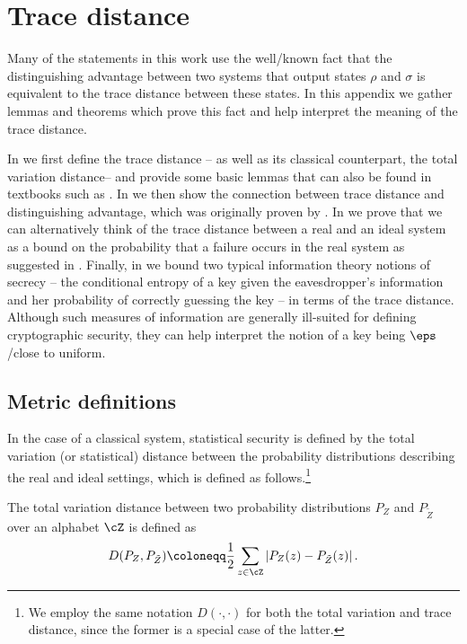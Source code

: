 \section{Trace distance}
\label{app:op}

Many of the statements in this work use the well\-/known fact that the
distinguishing advantage between two systems that output states $\rho$
and $\sigma$ is equivalent to the trace distance between these
states. In this appendix we gather lemmas and theorems which prove
this fact and help interpret the meaning of the trace distance.

In  we first define the trace distance
\--- as well as its classical counterpart, the total variation
distance\--- and provide some basic lemmas that can also be found in
textbooks such as \textcite{nielsen2010quantum}. In
 we then show the connection between trace
distance and distinguishing advantage, which was originally proven by
\textcite{Hel76}. In  we prove that
we can alternatively think of the trace distance between a real and
an ideal system as a bound on the probability that a failure occurs in
the real system as suggested in \textcite{Ren05}. Finally, in
 we bound two typical information theory
notions of secrecy \--- the conditional entropy of a key given the
eavesdropper's information and her probability of correctly guessing
the key \--- in terms of the trace distance. Although such measures of
information are generally ill-suited for defining cryptographic
security, they can help interpret the notion of a key being
$\eps$\-/close to uniform.



\subsection{Metric definitions}
\label{app:op.definitions}

In the case of a classical system, statistical security is defined by
the total variation (or statistical) distance between the probability
distributions describing the real and ideal settings, which is defined
as follows.\footnote{We employ the same notation $D(\cdot,\cdot)$ for
  both the total variation and trace distance, since the former is a
  special case of the latter.}

\begin{deff}
  \label{def:vdist}
  The total variation distance between two probability distributions
  $P_Z$ and $P_{\tilde{Z}}$ over an alphabet $\cZ$ is defined as
  \[D(P_Z,P_{\tilde{Z}}) \coloneqq \frac{1}{2} \sum_{z \in \cZ} \left| P_Z(z) -
    P_{\tilde{Z}}(z) \right|.\]
\end{deff}

